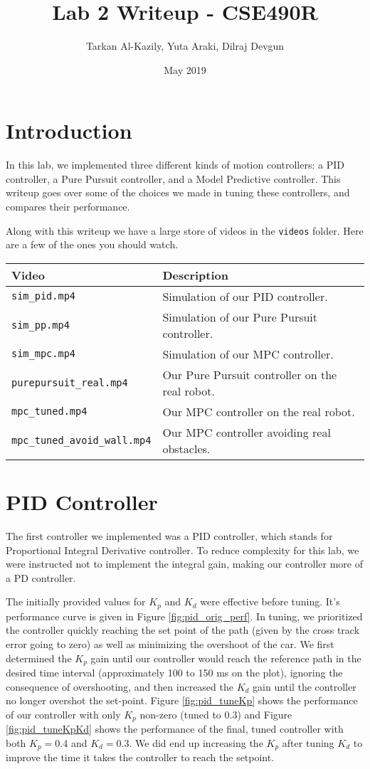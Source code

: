 \documentclass{article}
\title{Lab 2 Writeup - CSE490R}
\author{Tarkan Al-Kazily, Yuta Araki, Dilraj Devgun}
\date{May 2019}
\begin{document}
\maketitle

\section{Introduction}

In this lab, we implemented three different kinds of motion controllers:
a PID controller, a Pure Pursuit controller, and a Model Predictive controller.
This writeup goes over some of the choices we made in tuning these controllers,
and compares their performance.

Along with this writeup we have a large store of videos in the \texttt{videos} folder.
Here are a few of the ones you should watch.
\begin{center}
\begin{tabular}{l|l}
Video & Description \\
\hline
\texttt{sim\_pid.mp4} & Simulation of our PID controller. \\
\texttt{sim\_pp.mp4} & Simulation of our Pure Pursuit controller. \\
\texttt{sim\_mpc.mp4} & Simulation of our MPC controller. \\
\texttt{purepursuit\_real.mp4} & Our Pure Pursuit controller on the real robot. \\
\texttt{mpc\_tuned.mp4} & Our MPC controller on the real robot.  \\
\texttt{mpc\_tuned\_avoid\_wall.mp4} & Our MPC controller avoiding real obstacles.
\end{tabular}
\end{center}

\newpage
\section{PID Controller}

The first controller we implemented was a PID controller, which stands for
Proportional Integral Derivative controller. To reduce complexity for this
lab, we were instructed not to implement the integral gain, making our controller
more of a PD controller.

The initially provided values for $K_p$ and $K_d$ were effective before tuning.
It's performance curve is given in Figure \ref{fig:pid_orig_perf}.
In tuning, we prioritized the controller quickly reaching the set point of the
path (given by the cross track error going to zero) as well as minimizing
the overshoot of the car. We first determined the
$K_p$ gain until our controller would reach the reference path in the
desired time interval (approximately 100 to 150 ms on the plot), ignoring the consequence of
overshooting, and then increased the
$K_d$ gain until the controller no longer overshot the set-point.
Figure \ref{fig:pid_tuneKp} shows the performance of our controller with only
$K_p$ non-zero (tuned to $0.3$) and Figure \ref{fig:pid_tuneKpKd} shows
the performance of the final, tuned controller with both $K_p = 0.4$ and $K_d = 0.3$.
We did end up increasing the $K_p$ after tuning $K_d$ to improve the time it takes
the controller to reach the setpoint.
\end{document}
